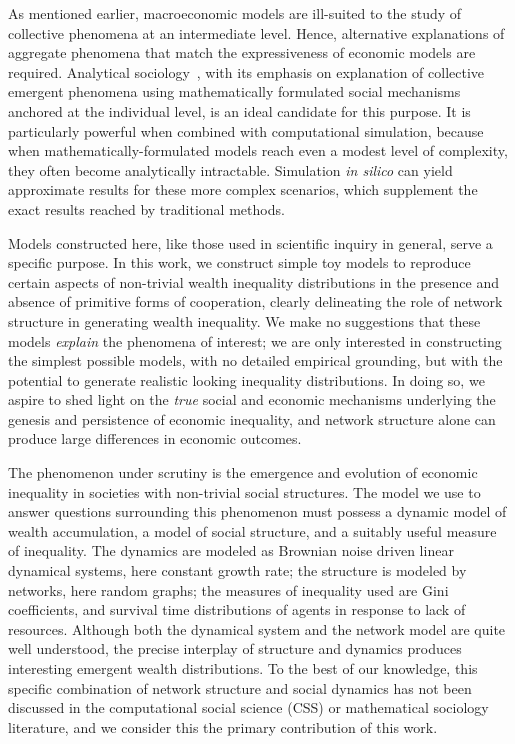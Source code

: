 \documentclass[sigconf]{acmart}
\begin{document}
As mentioned earlier, macroeconomic models are ill-suited to the study of collective phenomena at an intermediate level. Hence, alternative explanations of aggregate phenomena that match the expressiveness of economic models are required. Analytical sociology~\cite{ch1as_hdbk}, with its emphasis on explanation of collective emergent phenomena using mathematically formulated social mechanisms~\cite{ch2as_hdbk,ch11as_hdbk} anchored at the individual level, is an ideal candidate for this purpose. It is particularly powerful when combined with computational simulation, because when mathematically-formulated models reach even a modest level of complexity, they often become analytically intractable. Simulation \textit{in silico} can yield approximate results for these more complex scenarios, which supplement the exact results reached by traditional methods.

Models constructed here, like those used in scientific inquiry in general, serve a specific purpose. In this work, we construct simple toy models to reproduce certain aspects of non-trivial wealth inequality distributions in the presence and absence of primitive forms of cooperation, clearly delineating the role of network structure in generating wealth inequality. We make no suggestions that these models \textit{explain} the phenomena of interest; we are only interested in constructing the simplest possible models, with no detailed empirical grounding, but with the potential to generate realistic looking inequality distributions. In doing so, we aspire to shed light on the \textit{true} social and economic mechanisms underlying the genesis and persistence of economic inequality, and network structure alone can produce large differences in economic outcomes. 


\label{giniKindaSucks}
The phenomenon under scrutiny is the emergence and evolution of economic inequality in societies with non-trivial social structures. The model we use to answer questions surrounding this phenomenon must possess a dynamic model of wealth accumulation, a model of social structure, and a suitably useful measure of inequality. The dynamics are modeled as Brownian noise driven linear dynamical systems, here constant growth rate; the structure is modeled by networks, here random graphs; the measures of inequality used are Gini coefficients, and survival time distributions of agents in response to lack of resources. Although both the dynamical system and the network model are quite well understood, the precise interplay of structure and dynamics produces interesting emergent wealth distributions. To the best of our knowledge, this specific combination of network structure and social dynamics has not been discussed in the computational social science (CSS) or mathematical sociology literature, and we consider this the primary contribution of this work. 
\end{document}
